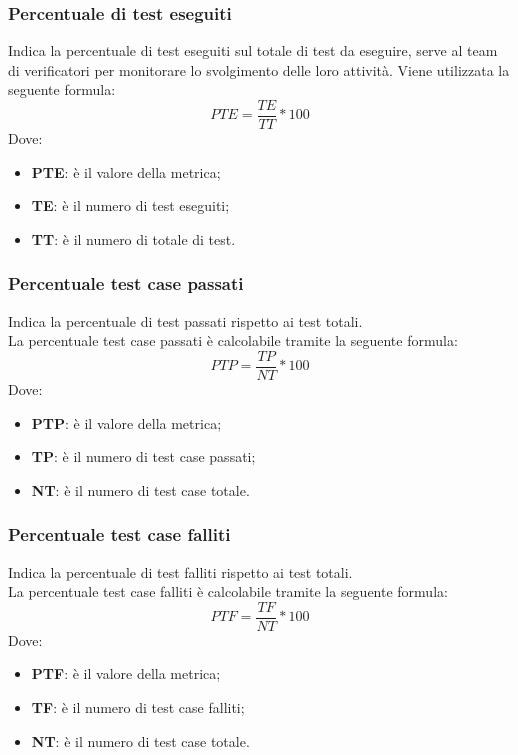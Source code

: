 \subsubsection{Percentuale di test eseguiti}
Indica la percentuale di test eseguiti sul totale di test da eseguire, serve al team di verificatori per monitorare lo svolgimento delle loro attività.
Viene utilizzata la seguente formula:
$$PTE=\frac{TE}{TT}*100$$
Dove:
\begin{itemize}
	\item{\textbf{PTE}: è il valore della metrica;}
	\item{\textbf{TE}: è il numero di test eseguiti;}
	\item{\textbf{TT}: è il numero di totale di test.}
\end{itemize}

\subsubsection{Percentuale test case passati}
Indica la percentuale di test passati rispetto ai test totali.\\
La percentuale test case passati è calcolabile tramite la seguente formula:
$$PTP=\frac{TP}{NT}*100$$
Dove:
\begin{itemize}
	\item{\textbf{PTP}: è il valore della metrica;}
	\item{\textbf{TP}: è il numero di test case passati;}
	\item{\textbf{NT}: è il numero di test case totale.}
\end{itemize}

\subsubsection{Percentuale test case falliti}
Indica la percentuale di test falliti rispetto ai test totali.\\
La percentuale test case falliti è calcolabile tramite la seguente formula:
$$PTF=\frac{TF}{NT}*100$$
Dove:
\begin{itemize}
	\item{\textbf{PTF}: è il valore della metrica;}
	\item{\textbf{TF}: è il numero di test case falliti;}
	\item{\textbf{NT}: è il numero di test case totale.}
\end{itemize}

